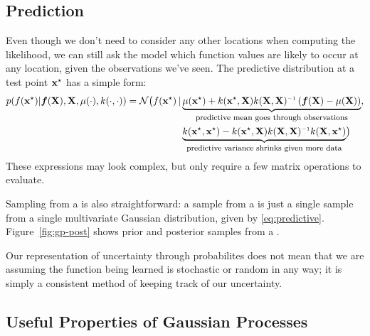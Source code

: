 \subsection{Prediction}
Even though we don't need to consider any other locations when computing the likelihood, we can still ask the model which function values are likely to occur at any location, given the observations we've seen.
The predictive distribution at a test point ${{\bf{x}}^\star}$ has a simple form:
%
\begin{align}
p( f(\testpoint) | \funcval, \vX, \mu(\cdot), k(\cdot, \cdot))
 = \mathcal{N} \big( f(\testpoint) \given & \underwrite{\mu(\testpoint) + k(\testpoint, \vX) k(\vX, \vX)\inv \left( \funcval - \mu(\vX) \right) }{\footnotesize predictive mean goes through observations}, \nonumber \\
 & \underwrite{k(\testpoint, \testpoint) - k(\testpoint, \vX) k(\vX, \vX)\inv k(\vX, \testpoint)}{\footnotesize predictive variance shrinks given more data}
 \big)
\label{eq:predictive}
\end{align}
%
These expressions may look complex, but only require a few matrix operations to evaluate.


Sampling from a \gp{} is also straightforward: a sample from a \gp{} is just a single sample from a single multivariate Gaussian distribution, given by \cref{eq:predictive}.
Figure~\ref{fig:gp-post} shows prior and posterior samples from a \gp{}.

Our representation of uncertainty through probabilites does not mean that we are assuming the function being learned is stochastic or random in any way; it is simply a consistent method of keeping track of our uncertainty.





\subsection{Useful Properties of Gaussian Processes}

